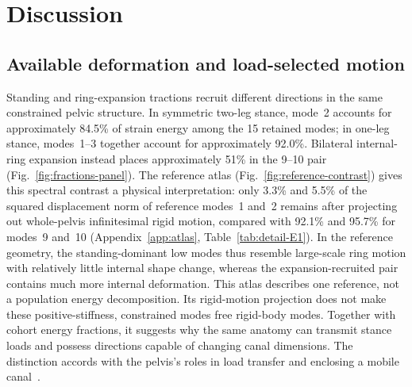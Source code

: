 \documentclass[pdflatex,sn-basic]{sn-jnl}
\begin{document}
\FloatBarrier
\section{Discussion}\label{sec:discussion}
\subsection{Available deformation and load-selected motion}
Standing and ring-expansion tractions recruit different directions in the same constrained pelvic structure. In symmetric two-leg stance, mode~2 accounts for approximately 84.5\% of strain energy among the 15 retained modes; in one-leg stance, modes~1--3 together account for approximately 92.0\%. Bilateral internal-ring expansion instead places approximately 51\% in the 9--10 pair (Fig.~\ref{fig:fractions-panel}). The reference atlas (Fig.~\ref{fig:reference-contrast}) gives this spectral contrast a physical interpretation: only 3.3\% and 5.5\% of the squared displacement norm of reference modes~1 and~2 remains after projecting out whole-pelvis infinitesimal rigid motion, compared with 92.1\% and 95.7\% for modes~9 and~10 (Appendix~\ref{app:atlas}, Table~\ref{tab:detail-E1}). In the reference geometry, the standing-dominant low modes thus resemble large-scale ring motion with relatively little internal shape change, whereas the expansion-recruited pair contains much more internal deformation. This atlas describes one reference, not a population energy decomposition. Its rigid-motion projection does not make these positive-stiffness, constrained modes free rigid-body modes. Together with cohort energy fractions, it suggests why the same anatomy can transmit stance loads and possess directions capable of changing canal dimensions. The distinction accords with the pelvis's roles in load transfer and enclosing a mobile canal~\citep{Vleeming2012,Reitter2014}.
\end{document}

